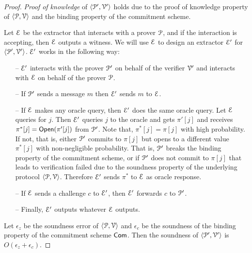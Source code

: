 \begin{proof}
	\textit{Proof of knowledge} of $\langle \mathcal{P}',\mathcal{V}'\rangle$ holds due to the proof of knowledge property of $\langle \mathcal{P},\mathcal{V}\rangle$ and the binding property of the commitment scheme.
	
	Let $\mathcal{E}$ be the extractor that interacts with a prover $\mathcal{P}$, and if the interaction is accepting, then $\mathcal{E}$ outputs a witness. We will use $\mathcal{E}$ to design an extractor $\mathcal{E}'$ for $\langle \mathcal{P}',\mathcal{V}'\rangle$. $\mathcal{E}'$ works in the following way:
	\begin{itemize}
		\item[--] $\mathcal{E}'$ interacts with the prover $\mathcal{P}'$ on behalf of the verifier $\mathcal{V}'$ and interacts with $\mathcal{E}$ on behalf of the prover $\mathcal{P}$.
		\item[--] If $\mathcal{P}'$ sends a message $m$ then $\mathcal{E}'$ sends $m$ to $\mathcal{E}$. 
		\item[--] If $\mathcal{E}$ makes any oracle query, then $\mathcal{E}'$ does the same oracle query. Let $\mathcal{E}$ queries for $j$. Then $\mathcal{E}'$ queries $j$ to the oracle and gets $\pi'[j]$ and receives $\pi^\ast[j] = \mathsf{Open}(\pi'[j])$ from $\mathcal{P}'$. 
		Note that, $\pi^\ast[j] = \pi[j]$ with high probability. If not, that is, either $\mathcal{P}'$ commits to $\pi[j]$ but opens to a different value $\pi^\ast[j]$ with non-negligible probability. That is, $\mathcal{P}'$ breaks the binding property of the commitment scheme, or if $\mathcal{P}'$ does not commit to $\pi[j]$ that leads to verification failed due to the soundness property of the underlying protocol $\langle \mathcal{P},\mathcal{V}\rangle$.
		Therefore $\mathcal{E}'$ sends $\pi^\ast$ to $\mathcal{E}$ as oracle response.
		\item[--] If $\mathcal{E}$ sends a challenge $c$ to $\mathcal{E}'$, then $\mathcal{E}'$ forwards $c$ to $\mathcal{P}'$.
		\item[--] Finally, $\mathcal{E}'$ outputs whatever $\mathcal{E}$ outputs. 
	\end{itemize}
	
	Let $\epsilon_z$ be the soundness error of $\langle \mathcal{P},\mathcal{V}\rangle$ and $\epsilon_c$ be the soundness of the binding property of the commitment scheme $\mathsf{Com}$. Then the soundness of $\langle \mathcal{P}',\mathcal{V}'\rangle$ is $O(\epsilon_z + \epsilon_c)$.
	
%	
	

\end{proof}
